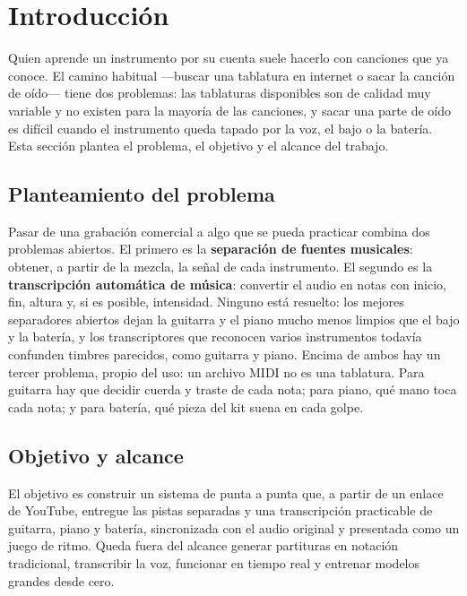 \documentclass[11pt,a4paper]{article}
\begin{document}
\section{Introducción}

Quien aprende un instrumento por su cuenta suele hacerlo con canciones que ya conoce. El camino
habitual ---buscar una tablatura en internet o sacar la canción de oído--- tiene dos problemas: las
tablaturas disponibles son de calidad muy variable y no existen para la mayoría de las canciones, y
sacar una parte de oído es difícil cuando el instrumento queda tapado por la voz, el bajo o la
batería. Esta sección plantea el problema, el objetivo y el alcance del trabajo.

\subsection{Planteamiento del problema}

Pasar de una grabación comercial a algo que se pueda practicar combina dos problemas abiertos. El
primero es la \textbf{separación de fuentes musicales}: obtener, a partir de la mezcla, la señal de
cada instrumento. El segundo es la \textbf{transcripción automática de música}: convertir el audio en
notas con inicio, fin, altura y, si es posible, intensidad. Ninguno está resuelto: los mejores
separadores abiertos dejan la guitarra y el piano mucho menos limpios que el bajo y la batería, y los
transcriptores que reconocen varios instrumentos todavía confunden timbres parecidos, como guitarra y
piano. Encima de ambos hay un tercer problema, propio del uso: un archivo MIDI no es una tablatura.
Para guitarra hay que decidir cuerda y traste de cada nota; para piano, qué mano toca cada nota; y
para batería, qué pieza del kit suena en cada golpe.

\subsection{Objetivo y alcance}

El objetivo es construir un sistema de punta a punta que, a partir de un enlace de YouTube, entregue
las pistas separadas y una transcripción practicable de guitarra, piano y batería, sincronizada con el
audio original y presentada como un juego de ritmo. Queda fuera del alcance generar partituras en
notación tradicional, transcribir la voz, funcionar en tiempo real y entrenar modelos grandes desde
cero.
\end{document}
